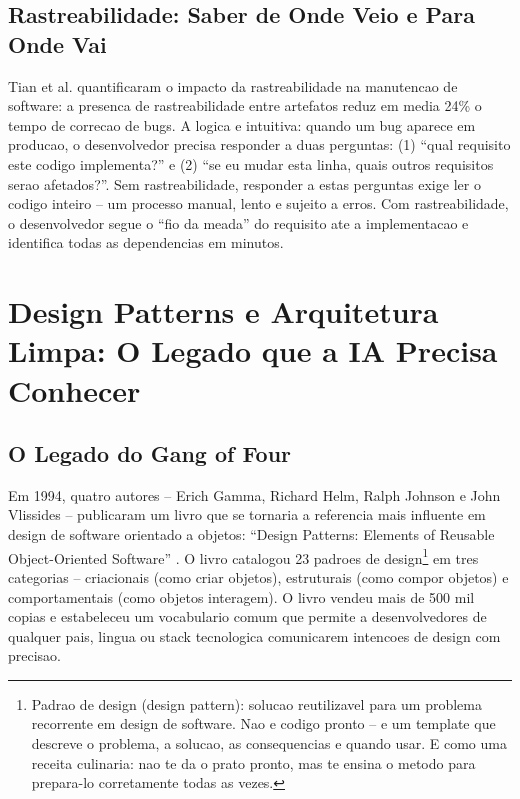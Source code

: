 \documentclass[12pt,a4paper,oneside,sumario=tradicional,chapter=TITLE,section=TITLE,subsection=TITLE,english,brazil]{abntex2}
\begin{document}
\subsection{Rastreabilidade: Saber de Onde Veio e Para Onde Vai}

Tian et al. \cite{tian2021impact} quantificaram o impacto da rastreabilidade na manutencao de software: a presenca de rastreabilidade entre artefatos reduz em media 24\% o tempo de correcao de bugs. A logica e intuitiva: quando um bug aparece em producao, o desenvolvedor precisa responder a duas perguntas: (1) ``qual requisito este codigo implementa?'' e (2) ``se eu mudar esta linha, quais outros requisitos serao afetados?''. Sem rastreabilidade, responder a estas perguntas exige ler o codigo inteiro -- um processo manual, lento e sujeito a erros. Com rastreabilidade, o desenvolvedor segue o ``fio da meada'' do requisito ate a implementacao e identifica todas as dependencias em minutos.

\section{Design Patterns e Arquitetura Limpa: O Legado que a IA Precisa Conhecer}

\subsection{O Legado do Gang of Four}

Em 1994, quatro autores -- Erich Gamma, Richard Helm, Ralph Johnson e John Vlissides -- publicaram um livro que se tornaria a referencia mais influente em design de software orientado a objetos: ``Design Patterns: Elements of Reusable Object-Oriented Software'' \cite{gamma1994design}. O livro catalogou 23 padroes de design\footnote{Padrao de design (design pattern): solucao reutilizavel para um problema recorrente em design de software. Nao e codigo pronto -- e um template que descreve o problema, a solucao, as consequencias e quando usar. E como uma receita culinaria: nao te da o prato pronto, mas te ensina o metodo para prepara-lo corretamente todas as vezes.} em tres categorias -- criacionais (como criar objetos), estruturais (como compor objetos) e comportamentais (como objetos interagem). O livro vendeu mais de 500 mil copias e estabeleceu um vocabulario comum que permite a desenvolvedores de qualquer pais, lingua ou stack tecnologica comunicarem intencoes de design com precisao.
\end{document}

